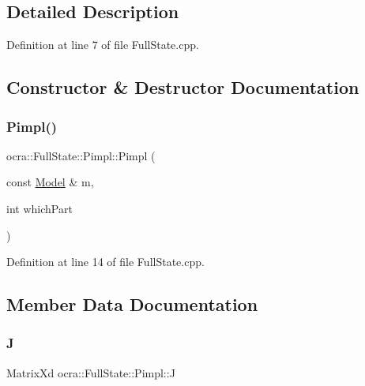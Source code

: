\subsection{Detailed Description}


Definition at line 7 of file Full\+State.\+cpp.



\subsection{Constructor \& Destructor Documentation}
\hypertarget{structocra_1_1FullState_1_1Pimpl_a0bede192675a41ae72485eacefca15ac}{}\label{structocra_1_1FullState_1_1Pimpl_a0bede192675a41ae72485eacefca15ac} 
\subsubsection{\texorpdfstring{Pimpl()}{Pimpl()}}
{\footnotesize\ttfamily ocra\+::\+Full\+State\+::\+Pimpl\+::\+Pimpl (\begin{DoxyParamCaption}\item[{const \hyperlink{classocra_1_1Model}{Model} \&}]{m,  }\item[{int}]{which\+Part }\end{DoxyParamCaption})\hspace{0.3cm}{\ttfamily [inline]}}



Definition at line 14 of file Full\+State.\+cpp.



\subsection{Member Data Documentation}
\hypertarget{structocra_1_1FullState_1_1Pimpl_a150f47fa013614729e1e6aedf141523f}{}\label{structocra_1_1FullState_1_1Pimpl_a150f47fa013614729e1e6aedf141523f} 
\subsubsection{\texorpdfstring{J}{J}}
{\footnotesize\ttfamily Matrix\+Xd ocra\+::\+Full\+State\+::\+Pimpl\+::J}



